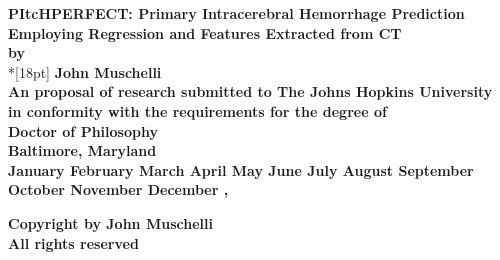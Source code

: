 \documentclass[12pt]{report}
\newcommand{\MONTH}{%
  \ifcase\the\month
  \or January%
  \or February%
  \or March%
  \or April%
  \or May%
  \or June%
  \or July%
  \or August%
  \or September%
  \or October%
  \or November%
  \or December%
  \fi}
\begin{document}
 \newcommand{\bm}[1]{ \mbox{\boldmath $ #1 $} }
 \newcommand{\bin}[2]{\left(\begin{array}{@{}c@{}} #1 \\ #2
             \end{array}\right) }
 \renewcommand{\contentsname}{Table of Contents}
 \baselineskip=24pt
 
 
\newcommand{\mytitle}{PItcHPERFECT: Primary Intracerebral Hemorrhage Prediction Employing Regression and Features Extracted from CT}
\thispagestyle{empty}
\begin{center}
\vspace*{.25in}
{\bf\LARGE{\mytitle}}\\
\vspace*{.75in}
{\bf by} \\*[18pt]
\vspace*{.6in}
{\bf John Muschelli}\\
\vspace*{1.2in}
{\bf An proposal of research submitted to The Johns Hopkins University\\
in conformity with the requirements for the degree of\\
Doctor of Philosophy}\\
\vspace*{.75in}
{\bf Baltimore, Maryland} \\
{\bf \MONTH, \the\year} \\     %
\vspace*{.5in}
\begin{small}
{\bf Copyright {\the\year} by John Muschelli} \\ %
{\bf All rights reserved}
\end{small}
\end{center}
 
\end{document}
